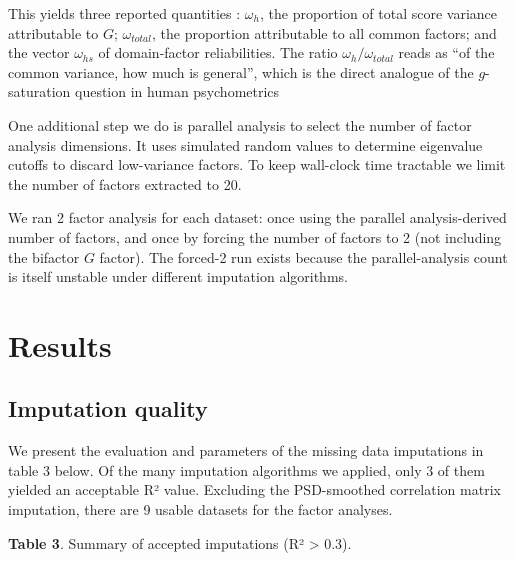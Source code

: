 \documentclass{article} %
\begin{document}
This yields three reported quantities \citep{revelle2009}: \(\omega_h\), the proportion of total score variance attributable to \(G\); \(\omega_{total}\), the proportion attributable to all common
factors; and the vector \(\omega_{hs}\) of domain-factor reliabilities. The ratio \(\omega_h / \omega_{total}\) reads as ``of the common variance, how much is general'', which is the direct analogue
of the \(g\)-saturation question in human psychometrics

One additional step we do is parallel analysis \citep{horn1965} to select the number of factor analysis dimensions. It uses simulated random values to determine eigenvalue cutoffs to discard
low-variance factors. To keep wall-clock time tractable we limit the number of factors extracted to 20.

We ran 2 factor analysis for each dataset: once using the parallel analysis-derived number of factors, and once by forcing the number of factors to 2 (not including the bifactor \(G\) factor). The
forced-2 run exists because the parallel-analysis count is itself unstable under different imputation algorithms.

\hypertarget{results}{%
\section{Results}\label{results}}

\hypertarget{imputation-quality}{%
\subsection{Imputation quality}\label{imputation-quality}}

We present the evaluation and parameters of the missing data imputations in table 3 below. Of the many imputation algorithms we applied, only 3 of them yielded an acceptable R² value. Excluding the
PSD-smoothed correlation matrix imputation, there are 9 usable datasets for the factor analyses.

\textbf{Table 3}. Summary of accepted imputations (R² \textgreater{} 0.3).
\end{document}
